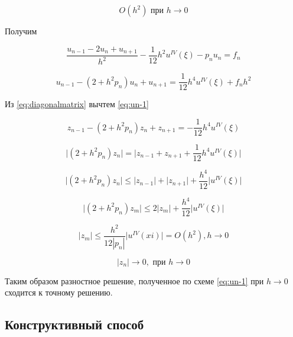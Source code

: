 \begin{equation*}
    O(h^2) \text{ при } h \to 0
\end{equation*}

Получим

\begin{equation*}
    \frac{u_{n-1} - 2u_n + u_{n+1}}{h^2} - \frac{1}{12} h^2 u^{IV} (\xi) -
    p_nu_n = f_n
\end{equation*}

\begin{equation}\label{eq:un-1}
    u_{n-1} - (2 + h^2p_n) u_n + u_{n+1} = \frac{1}{12} h^4 u^{IV}(\xi) +
    f_nh^2
\end{equation}

Из \ref{eq:diagonalmatrix} вычтем \ref{eq:un-1}

\begin{equation*}
    z_{n-1} - (2+h^2p_n)z_n + z_{n+1} = -\frac{1}{12} h^4 u^{IV}(\xi)
\end{equation*}

\begin{equation*}
    \big|(2+h^2p_n)z_n\big| = \big|z_{n-1} + z_{n+1} + \frac{1}{12} h^4 u^{IV}(\xi)\big|
\end{equation*}

\begin{equation*}
    \big|(2+h^2p_n)z_n\big| \le \big|z_{n-1}\big| + \big|z_{n+1}\big| + \frac{h^4}{12}
    \big|u^{IV}(\xi)\big|
\end{equation*}

\begin{equation*}
    \big| (2+h^2p_n)z_m \big| \le 2 \big| z_m \big| + \frac{h^4}{12}
    \big|u^{IV} (\xi) \big|
\end{equation*}

\begin{equation*}
    \big| z_m \big| \le \frac{h^2}{12|p_n|} \big| u^{IV} (xi) \big| =
    O(h^2), h \to 0
\end{equation*}

\begin{equation*}
    \big| z_n \big| \to 0, \text{ при } h \to 0
\end{equation*}

Таким образом разностное решение, полученное по схеме
\ref{eq:un-1} при $h \to 0$ сходится к точному решению.

\subsection{Конструктивный способ}

